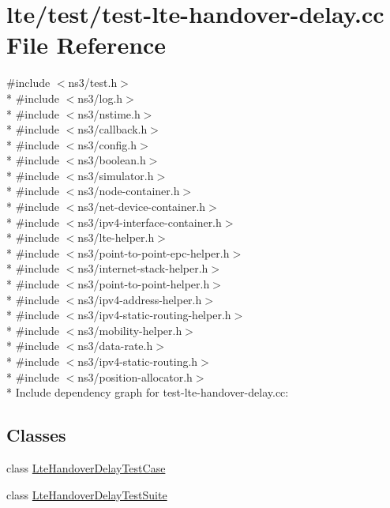 \hypertarget{test-lte-handover-delay_8cc}{}\section{lte/test/test-\/lte-\/handover-\/delay.cc File Reference}
\label{test-lte-handover-delay_8cc}
{\ttfamily \#include $<$ns3/test.\+h$>$}\\*
{\ttfamily \#include $<$ns3/log.\+h$>$}\\*
{\ttfamily \#include $<$ns3/nstime.\+h$>$}\\*
{\ttfamily \#include $<$ns3/callback.\+h$>$}\\*
{\ttfamily \#include $<$ns3/config.\+h$>$}\\*
{\ttfamily \#include $<$ns3/boolean.\+h$>$}\\*
{\ttfamily \#include $<$ns3/simulator.\+h$>$}\\*
{\ttfamily \#include $<$ns3/node-\/container.\+h$>$}\\*
{\ttfamily \#include $<$ns3/net-\/device-\/container.\+h$>$}\\*
{\ttfamily \#include $<$ns3/ipv4-\/interface-\/container.\+h$>$}\\*
{\ttfamily \#include $<$ns3/lte-\/helper.\+h$>$}\\*
{\ttfamily \#include $<$ns3/point-\/to-\/point-\/epc-\/helper.\+h$>$}\\*
{\ttfamily \#include $<$ns3/internet-\/stack-\/helper.\+h$>$}\\*
{\ttfamily \#include $<$ns3/point-\/to-\/point-\/helper.\+h$>$}\\*
{\ttfamily \#include $<$ns3/ipv4-\/address-\/helper.\+h$>$}\\*
{\ttfamily \#include $<$ns3/ipv4-\/static-\/routing-\/helper.\+h$>$}\\*
{\ttfamily \#include $<$ns3/mobility-\/helper.\+h$>$}\\*
{\ttfamily \#include $<$ns3/data-\/rate.\+h$>$}\\*
{\ttfamily \#include $<$ns3/ipv4-\/static-\/routing.\+h$>$}\\*
{\ttfamily \#include $<$ns3/position-\/allocator.\+h$>$}\\*
Include dependency graph for test-\/lte-\/handover-\/delay.cc\+:
\subsection*{Classes}
\begin{DoxyCompactItemize}
\item 
class \hyperlink{classLteHandoverDelayTestCase}{Lte\+Handover\+Delay\+Test\+Case}
\item 
class \hyperlink{classLteHandoverDelayTestSuite}{Lte\+Handover\+Delay\+Test\+Suite}
\end{DoxyCompactItemize}
